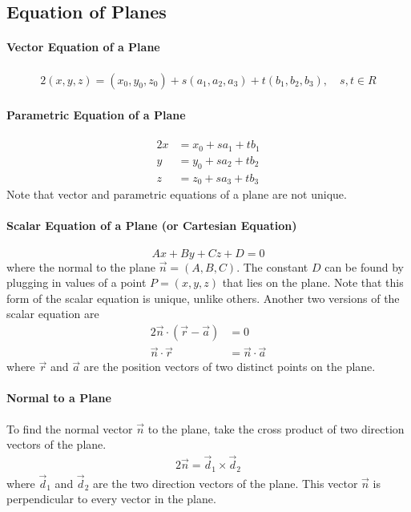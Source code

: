 \documentclass[letterpaper, 12pt]{report}
\theoremstyle{definition}
\numberwithin{equation}{section}
\begin{document}
\subsection{Equation of Planes}
\paragraph{Vector Equation of a Plane}
\begin{alignat}{2}{}
	(x,y,z) = (x_0,y_0,z_0) + s(a_1,a_2,a_3) + t(b_1,b_2,b_3), \quad s,t \in R
\end{alignat}

\paragraph{Parametric Equation of a Plane}
\begin{alignat}{2}{}
	x &= x_0 + sa_1 + tb_1 \\
	y &= y_0 + sa_2 + tb_2 \\
	z &= z_0 + sa_3 + tb_3
\end{alignat}
Note that vector and parametric equations of a plane are not unique.

\paragraph{Scalar Equation of a Plane (or Cartesian Equation)}
\begin{equation}
	Ax+By+Cz+D=0
\end{equation}
where the normal to the plane $\vec n = (A,B,C)$. The constant $D$ can be found by plugging in values of a point $P=(x,y,z)$ that lies on the plane. Note that this form of the scalar equation is unique, unlike others. Another two versions of the scalar equation are
\begin{alignat}{2}{}
	\vec n \cdot (\vec r - \vec a) &= 0 \\
	\vec n \cdot \vec r &= \vec n \cdot \vec a
\end{alignat}
where $\vec r$ and $\vec a$ are the position vectors of two distinct points on the plane.

\paragraph{Normal to a Plane}
To find the normal vector $\vec n$ to the plane, take the cross product of two direction vectors of the plane.
\begin{alignat}{2}{}
	\vec n = \vec d_1 \times \vec d_2
\end{alignat}
where $\vec d_1$ and $\vec d_2$ are the two direction vectors of the plane. This vector $\vec n$ is perpendicular to every vector in the plane.
\end{document}
